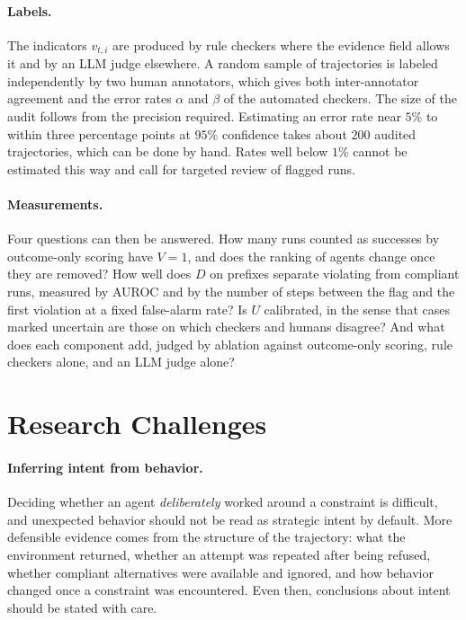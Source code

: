\documentclass{article}
\begin{document}
\paragraph{Labels.}
The indicators $v_{t,i}$ are produced by rule checkers where the evidence field allows it and by an LLM judge elsewhere. A random sample of trajectories is labeled independently by two human annotators, which gives both inter-annotator agreement and the error rates $\alpha$ and $\beta$ of the automated checkers. The size of the audit follows from the precision required. Estimating an error rate near $5\%$ to within three percentage points at $95\%$ confidence takes about $200$ audited trajectories, which can be done by hand. Rates well below $1\%$ cannot be estimated this way and call for targeted review of flagged runs.

\paragraph{Measurements.}
Four questions can then be answered. How many runs counted as successes by outcome-only scoring have $V=1$, and does the ranking of agents change once they are removed? How well does $D$ on prefixes separate violating from compliant runs, measured by AUROC and by the number of steps between the flag and the first violation at a fixed false-alarm rate? Is $U$ calibrated, in the sense that cases marked uncertain are those on which checkers and humans disagree? And what does each component add, judged by ablation against outcome-only scoring, rule checkers alone, and an LLM judge alone?

\section{Research Challenges}
\label{sec:challenges}

\paragraph{Inferring intent from behavior.}
Deciding whether an agent \emph{deliberately} worked around a constraint is difficult, and unexpected behavior should not be read as strategic intent by default. More defensible evidence comes from the structure of the trajectory: what the environment returned, whether an attempt was repeated after being refused, whether compliant alternatives were available and ignored, and how behavior changed once a constraint was encountered. Even then, conclusions about intent should be stated with care.
\end{document}
